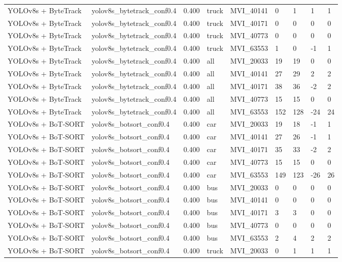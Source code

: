 \begin{tabular}{lllllllll}
YOLOv8s + ByteTrack & yolov8s\_bytetrack\_conf0.4 & 0.400 & truck & MVI\_40141 & 0 & 1 & 1 & 1 \\
YOLOv8s + ByteTrack & yolov8s\_bytetrack\_conf0.4 & 0.400 & truck & MVI\_40171 & 0 & 0 & 0 & 0 \\
YOLOv8s + ByteTrack & yolov8s\_bytetrack\_conf0.4 & 0.400 & truck & MVI\_40773 & 0 & 0 & 0 & 0 \\
YOLOv8s + ByteTrack & yolov8s\_bytetrack\_conf0.4 & 0.400 & truck & MVI\_63553 & 1 & 0 & -1 & 1 \\
YOLOv8s + ByteTrack & yolov8s\_bytetrack\_conf0.4 & 0.400 & all & MVI\_20033 & 19 & 19 & 0 & 0 \\
YOLOv8s + ByteTrack & yolov8s\_bytetrack\_conf0.4 & 0.400 & all & MVI\_40141 & 27 & 29 & 2 & 2 \\
YOLOv8s + ByteTrack & yolov8s\_bytetrack\_conf0.4 & 0.400 & all & MVI\_40171 & 38 & 36 & -2 & 2 \\
YOLOv8s + ByteTrack & yolov8s\_bytetrack\_conf0.4 & 0.400 & all & MVI\_40773 & 15 & 15 & 0 & 0 \\
YOLOv8s + ByteTrack & yolov8s\_bytetrack\_conf0.4 & 0.400 & all & MVI\_63553 & 152 & 128 & -24 & 24 \\
YOLOv8s + BoT-SORT & yolov8s\_botsort\_conf0.4 & 0.400 & car & MVI\_20033 & 19 & 18 & -1 & 1 \\
YOLOv8s + BoT-SORT & yolov8s\_botsort\_conf0.4 & 0.400 & car & MVI\_40141 & 27 & 26 & -1 & 1 \\
YOLOv8s + BoT-SORT & yolov8s\_botsort\_conf0.4 & 0.400 & car & MVI\_40171 & 35 & 33 & -2 & 2 \\
YOLOv8s + BoT-SORT & yolov8s\_botsort\_conf0.4 & 0.400 & car & MVI\_40773 & 15 & 15 & 0 & 0 \\
YOLOv8s + BoT-SORT & yolov8s\_botsort\_conf0.4 & 0.400 & car & MVI\_63553 & 149 & 123 & -26 & 26 \\
YOLOv8s + BoT-SORT & yolov8s\_botsort\_conf0.4 & 0.400 & bus & MVI\_20033 & 0 & 0 & 0 & 0 \\
YOLOv8s + BoT-SORT & yolov8s\_botsort\_conf0.4 & 0.400 & bus & MVI\_40141 & 0 & 0 & 0 & 0 \\
YOLOv8s + BoT-SORT & yolov8s\_botsort\_conf0.4 & 0.400 & bus & MVI\_40171 & 3 & 3 & 0 & 0 \\
YOLOv8s + BoT-SORT & yolov8s\_botsort\_conf0.4 & 0.400 & bus & MVI\_40773 & 0 & 0 & 0 & 0 \\
YOLOv8s + BoT-SORT & yolov8s\_botsort\_conf0.4 & 0.400 & bus & MVI\_63553 & 2 & 4 & 2 & 2 \\
YOLOv8s + BoT-SORT & yolov8s\_botsort\_conf0.4 & 0.400 & truck & MVI\_20033 & 0 & 1 & 1 & 1 \\

\end{tabular}
